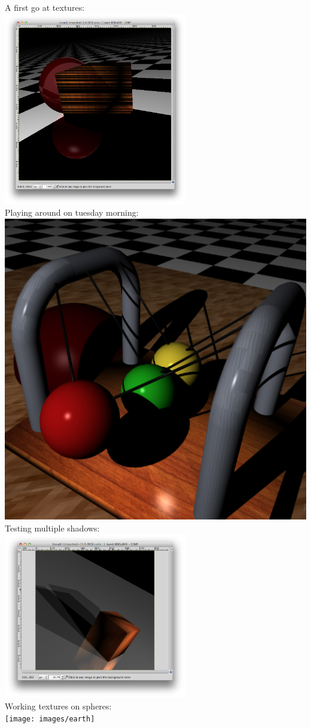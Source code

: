 \documentclass[a4paper,11pt]{article}
\begin{document}
A first go at textures:\\
\includegraphics[keepaspectratio,width=8.0cm]{images/texture}\\

\newpage Playing around on tuesday morning:\\
\includegraphics[scale=0.5]{images/playing}\\

Testing multiple shadows:\\
\includegraphics[keepaspectratio,width=8.0cm]{images/mshadows}\\

\newpage Working textures on spheres:\\
\texttt{[image: images/earth]}\\
\end{document}
